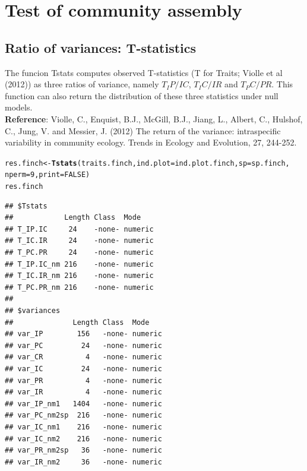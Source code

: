 \documentclass[12pt]{article}\usepackage[]{graphicx}\usepackage[]{color}
\makeatletter
\newcommand{\hlnum}[1]{\textcolor[rgb]{0.686,0.059,0.569}{#1}}%
\newcommand{\hlstd}[1]{\textcolor[rgb]{0.345,0.345,0.345}{#1}}%
\newcommand{\hlkwb}[1]{\textcolor[rgb]{0.69,0.353,0.396}{#1}}%
\newcommand{\hlkwc}[1]{\textcolor[rgb]{0.333,0.667,0.333}{#1}}%
\newcommand{\hlkwd}[1]{\textcolor[rgb]{0.737,0.353,0.396}{\textbf{#1}}}%
\newenvironment{kframe}{%
 \def\at@end@of@kframe{}%
 \ifinner\ifhmode%
  \def\at@end@of@kframe{\end{minipage}}%
  \begin{minipage}{\columnwidth}%
 \fi\fi%
 \def\FrameCommand##1{\hskip\@totalleftmargin \hskip-\fboxsep
 \colorbox{shadecolor}{##1}\hskip-\fboxsep
     \hskip-\linewidth \hskip-\@totalleftmargin \hskip\columnwidth}%
 \MakeFramed {\advance\hsize-\width
   \@totalleftmargin\z@ \linewidth\hsize
   \@setminipage}}%
 {\par\unskip\endMakeFramed%
 \at@end@of@kframe}
\newenvironment{knitrout}{}{} %
\makeatother
\begin{document}
\newpage

\section{Test of community assembly}

\subsection{Ratio of variances: T-statistics}

The funcion Tstats computes observed T-statistics (T for Traits; Violle et al (2012)) as three ratios of variance, namely $T_IP/IC$, $T_IC/IR$ and $T_PC/PR$. This function can also return the distribution of these three statistics under null models.
\\

\textbf{Reference}: Violle, C., Enquist, B.J., McGill, B.J., Jiang, L., Albert, C., Hulshof, C., Jung, V. and Messier, J. (2012) The return of the variance: intraspecific variability in community ecology. Trends in Ecology and Evolution, 27, 244-252.

\begin{knitrout}
\color{fgcolor}\begin{kframe}
\begin{alltt}
\hlstd{res.finch}\hlkwb{<-}\hlkwd{Tstats}\hlstd{(traits.finch,} \hlkwc{ind.plot}\hlstd{=ind.plot.finch,} \hlkwc{sp}\hlstd{=sp.finch,}
                  \hlkwc{nperm}\hlstd{=}\hlnum{9}\hlstd{,} \hlkwc{print}\hlstd{=}\hlnum{FALSE}\hlstd{)}
\hlstd{res.finch}
\end{alltt}
\begin{verbatim}
## $Tstats
##            Length Class  Mode   
## T_IP.IC     24    -none- numeric
## T_IC.IR     24    -none- numeric
## T_PC.PR     24    -none- numeric
## T_IP.IC_nm 216    -none- numeric
## T_IC.IR_nm 216    -none- numeric
## T_PC.PR_nm 216    -none- numeric
## 
## $variances
##              Length Class  Mode   
## var_IP        156   -none- numeric
## var_PC         24   -none- numeric
## var_CR          4   -none- numeric
## var_IC         24   -none- numeric
## var_PR          4   -none- numeric
## var_IR          4   -none- numeric
## var_IP_nm1   1404   -none- numeric
## var_PC_nm2sp  216   -none- numeric
## var_IC_nm1    216   -none- numeric
## var_IC_nm2    216   -none- numeric
## var_PR_nm2sp   36   -none- numeric
## var_IR_nm2     36   -none- numeric
\end{verbatim}
\end{kframe}
\end{knitrout}
\end{document}
